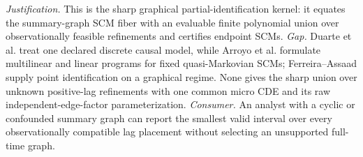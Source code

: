 \documentclass{article}
\begin{document}
\par\smallskip\noindent \textit{Justification.} This is the sharp graphical partial-identification kernel: it equates the summary-graph SCM fiber with an evaluable finite polynomial union over observationally feasible refinements and certifies endpoint SCMs. \textit{Gap.} Duarte et al. treat one declared discrete causal model, while Arroyo et al. formulate multilinear and linear programs for fixed quasi-Markovian SCMs; Ferreira--Assaad supply point identification on a graphical regime. None gives the sharp union over unknown positive-lag refinements with one common micro CDE and its raw independent-edge-factor parameterization. \textit{Consumer.} An analyst with a cyclic or confounded summary graph can report the smallest valid interval over every observationally compatible lag placement without selecting an unsupported full-time graph.
\end{document}
